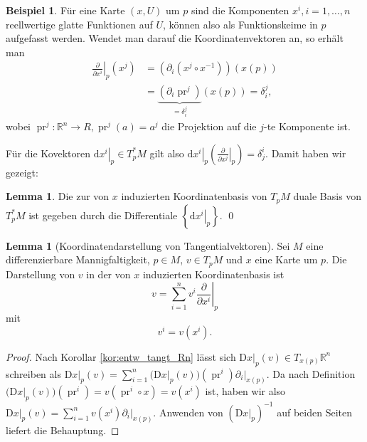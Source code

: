 \documentclass[a4paper]{scrbook}
\numberwithin{equation}{chapter}
\newcommand{\D}{\mathrm{d}}
\newcommand{\DD}{\mathrm{D}}
\DeclareMathOperator{\pr}{pr}
\newcommand{\R}{\mathbb{R}}
\theoremstyle{definition}
\newtheorem{lemma}[defn]{Lemma}
\newtheorem{bsp}[defn]{Beispiel}
\begin{document}
\begin{bsp}
	Für eine Karte $(x,U)$ um $p$ sind die Komponenten $x^i, i = 1,\dots, n$ reellwertige glatte Funktionen auf $U$, können also als Funktionskeime in $p$ aufgefasst werden. Wendet man darauf die Koordinatenvektoren an, so erhält man
	\begin{align*}
		\left.\frac{\partial}{\partial x^i}\right|_p (x^j) &= \left(\partial_i \left(x^j\circ x^{-1}\right)\right) (x(p))\\
		&= \underbrace{\left(\partial_i \pr^j\right)}_{= \delta^j_i} (x(p)) = \delta^j_i,
	\end{align*}
	wobei $\pr^j\colon \mathbb R^n \to R, \pr^j(a) = a^j$ die Projektion auf die $j$-te Komponente ist.
\end{bsp}
Für die Kovektoren $\left.\D x^i\right|_p \in T_p^*M$ gilt also $\left.\D x^i\right|_p\left(\left.\frac{\partial}{\partial x^j}\right|_p\right) = \delta^i_j$. Damit haben wir gezeigt:
\begin{lemma}
	Die zur von $x$ induzierten Koordinatenbasis von $T_pM$ duale Basis von $T_p^*M$ ist gegeben durch die Differentiale $\left\{\left.\D x^i\right|_p \right\}$. \qed
\end{lemma}

\begin{lemma}[Koordinatendarstellung von Tangentialvektoren]
	Sei $M$ eine differenzierbare Mannigfaltigkeit, $p \in M$, $v \in T_pM$ und $x$ eine Karte um $p$. Die Darstellung von $v$ in der von $x$ induzierten Koordinatenbasis ist
	\[v = \sum_{i=1}^n v^i \left.\frac{\partial}{\partial x^i}\right|_p\]
	mit
	\[v^i = v(x^i).\]

	\begin{proof}
		Nach Korollar \ref{kor:entw_tangt_Rn} lässt sich $\left.\DD x\right|_p(v) \in T_{x(p)}\R^n$ schreiben als $\left.\DD x\right|_p(v) = \sum_{i=1}^n \Big(\DD x\big|_p(v)\Big) (\pr^i) \left.\partial_i\right|_{x(p)}$. Da nach Definition $\Big(\DD x\big|_p(v)\Big) (\pr^i) = v(\pr^i \circ x) = v(x^i)$ ist, haben wir also $\left.\DD x\right|_p(v) = \sum_{i=1}^n v(x^i) \left.\partial_i\right|_{x(p)}$.
		Anwenden von $\left(\left.\DD x\right|_p\right)^{-1}$ auf beiden Seiten liefert die Behauptung.
	\end{proof}
\end{lemma}
\end{document}
